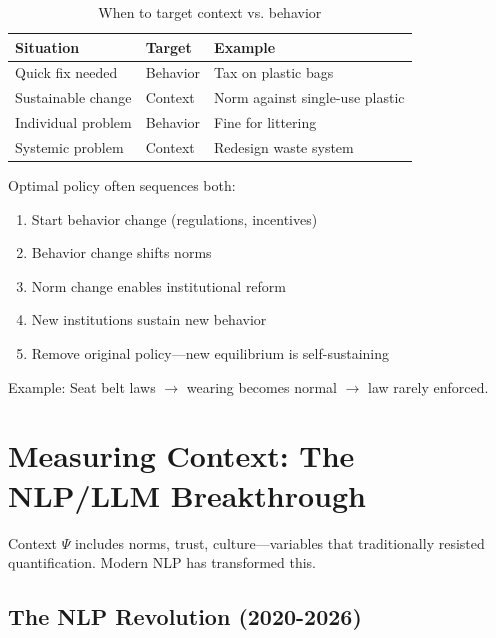 \begin{table}[h]
\centering
\begin{tabular}{lll}
\toprule
\textbf{Situation} & \textbf{Target} & \textbf{Example} \\
\midrule
Quick fix needed & Behavior & Tax on plastic bags \\
Sustainable change & Context & Norm against single-use plastic \\
Individual problem & Behavior & Fine for littering \\
Systemic problem & Context & Redesign waste system \\
\bottomrule
\end{tabular}
\caption{When to target context vs. behavior}
\label{tab:policy-targeting}
\end{table}

\begin{intuition}
Optimal policy often sequences both:
\begin{enumerate}[nosep]
  \item Start behavior change (regulations, incentives)
  \item Behavior change shifts norms
  \item Norm change enables institutional reform
  \item New institutions sustain new behavior
  \item Remove original policy---new equilibrium is self-sustaining
\end{enumerate}
Example: Seat belt laws $\rightarrow$ wearing becomes normal $\rightarrow$ law rarely enforced.
\end{intuition}



\section{Measuring Context: The NLP/LLM Breakthrough}
\label{sec:context-measurement}


Context $\Psi$ includes norms, trust, culture---variables that traditionally
resisted quantification. Modern NLP has transformed this.

\subsection{The NLP Revolution (2020-2026)}

